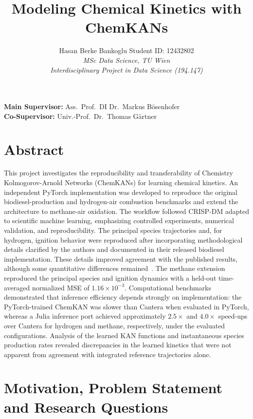 \documentclass[11pt,a4paper]{article}
\title{\textbf{Modeling Chemical Kinetics with ChemKANs}}
\author{
  Hasan Berke Bankoglu \quad Student ID: 12432802 \\[4pt]
  \textit{MSc Data Science, TU Wien}\\[4pt]
  \textit{Interdisciplinary Project in Data Science (194.147)}
}
\date{}
\begin{document}
\maketitle
\vspace{-1em}

\noindent\textbf{Main Supervisor:} Ass.\ Prof.\ DI Dr.\ Markus B\"osenhofer \\
\textbf{Co-Supervisor:} Univ.-Prof.\ Dr.\ Thomas G\"artner

\section*{Abstract}

This project investigates the reproducibility
and transferability of Chemistry
Kolmogorov-Arnold Networks (ChemKANs) for
learning chemical kinetics. An independent
PyTorch implementation was developed to
reproduce the original biodiesel-production
and hydrogen-air combustion benchmarks and
extend the architecture to methane-air oxidation.
The workflow followed CRISP-DM adapted to
scientific machine learning, emphasizing
controlled experiments, numerical validation,
and reproducibility. 
The principal species trajectories and,
for hydrogen, ignition behavior were reproduced
after incorporating methodological details
clarified by the authors and documented in
their released biodiesel implementation.
These details improved agreement with the
published results, although some quantitative
differences remained~\cite{ChemKANAuthors2026,ChemKANRepo2026}.
The methane extension reproduced the principal
species and ignition dynamics with a held-out
time-averaged normalized MSE of
$1.16\times10^{-3}$.
Computational benchmarks demonstrated that inference efficiency depends strongly on implementation: the PyTorch-trained ChemKAN was slower than
Cantera when evaluated in PyTorch, whereas a Julia inference port achieved
approximately $2.5\times$ and $4.0\times$ speed-ups over Cantera for hydrogen
and methane, respectively, under the evaluated configurations. Analysis
of the learned KAN functions and instantaneous
species production rates revealed discrepancies
in the learned kinetics that were not apparent
from agreement with integrated reference
trajectories alone.


\tableofcontents
\newpage

\section{Motivation, Problem Statement and Research Questions}
\end{document}
